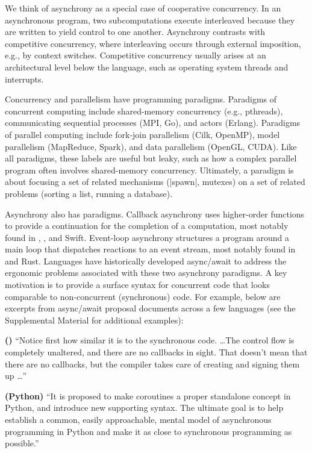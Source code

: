We think of asynchrony as a special case of cooperative concurrency. In an asynchronous program, two subcomputations execute interleaved because they are written to yield control to one another. Asynchrony contrasts with competitive concurrency, where interleaving occurs through external imposition, e.g., by context switches. Competitive concurrency usually arises at an architectural level below the language, such as operating system threads and interrupts.

Concurrency and parallelism have programming paradigms. Paradigms of concurrent computing include shared-memory concurrency (e.g., pthreads), communicating sequential processes (MPI, Go), and actors (Erlang). Paradigms of parallel computing include fork-join parallelism (Cilk, OpenMP), model parallelism (MapReduce, Spark), and data parallelism (OpenGL, CUDA).  Like all paradigms, these labels are useful but leaky, such as how a complex parallel program often involves shared-memory concurrency. Ultimately, a paradigm is about focusing a set of related mechanisms (\code|spawn|, mutexes) on a set of related problems (sorting a list, running a database).

Asynchrony also has paradigms. Callback asynchrony uses higher-order functions to provide a continuation for the completion of a computation, most notably found in \CSharp{}, \Js, and Swift. Event-loop asynchrony structures a program around a main loop that dispatches reactions to an event stream, most notably found in \Cpp and Rust. Languages have historically developed async/await to address the ergonomic problems associated with these two asynchrony paradigms. A key motivation is to provide a surface syntax for concurrent code that looks comparable to non-concurrent (synchronous) code. For example, below are excerpts from async/await proposal documents across a few languages (see the Supplemental Material for additional examples):

\begin{displayquote}%
  \textbf{(\CSharp{})} ``Notice first how similar it is to the synchronous code. \ldots The control flow is completely unaltered, and there are no callbacks in sight. That doesn’t mean that there are no callbacks, but the compiler takes care of creating and signing them up \ldots''~\cite{torgersen_asynchronous_nodate}
\end{displayquote}


\begin{displayquote}%
  \textbf{(Python)} ``It is proposed to make coroutines a proper standalone concept in Python, and introduce new supporting syntax. The ultimate goal is to help establish a common, easily approachable, mental model of asynchronous programming in Python and make it as close to synchronous programming as possible.''~\cite{selivanov_pep_2015}
\end{displayquote}

